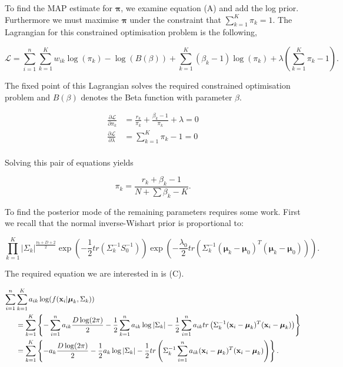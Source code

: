 \documentclass[12pt,english]{article}\usepackage[]{graphicx}\usepackage[]{color}
\begin{document}
To find the MAP estimate for $\boldsymbol{\pi}$, we examine equation
(A) and add the log prior.  Furthermore we must maximise
$\boldsymbol{\pi}$ under the constraint that
$\sum_{k=1}^{K}\pi_k = 1$. The Lagrangian for this constrained
optimisation problem is the following,

\begin{equation}
\mathcal{L}= \sum_{i=1}^{n}\sum_{k=1}^{K}w_{ik}\log(\pi_k) - \log(B(\beta)) + \sum_{k=1}^{K}(\beta_k - 1)\log(\pi_k) + \lambda\left(\sum_{k=1}^{K}\pi_k-1\right).
\end{equation}

The fixed point of this Lagrangian solves the required constrained
optimisation problem and $B(\beta)$ denotes the Beta function with
parameter $\beta$.

\begin{equation}
\begin{split}
\frac{\partial\mathcal{L}}{\partial \pi_k} &= \frac{r_k}{\pi_k} + \frac{\beta_k - 1}{\pi_k} + \lambda = 0\\
\frac{\partial\mathcal{L}}{\partial \lambda} &= \sum_{k=1}^{K}\pi_k - 1 = 0\\
\end{split}
\end{equation}

Solving this pair of equations yields

\begin{equation}
\pi_k = \frac{r_k + \beta_k - 1}{N + \sum \beta_k - K}.
\end{equation}

To find the posterior mode of the remaining parameters requires some
work.  First we recall that the normal inverse-Wishart prior is
proportional to:

\begin{equation}
\prod_{k=1}^{K}|\Sigma_{k}|^{\frac{\nu_0 + D + 2}{2}}\exp \left(-\frac{1}{2}tr(\Sigma_{k}^{-1}S_0^{-1})\right)\exp \left(-\frac{\lambda_0}{2}tr(\Sigma_{k}^{-1}(\boldsymbol{\mu}_k - \boldsymbol{\mu}_0)^{T}(\boldsymbol{\mu}_k - \boldsymbol{\mu}_0))\right).
\end{equation}

The required equation we are interested in is (C).

\begin{equation}
\begin{split}
\sum_{i=1}^{n} &\sum_{k=1}^{K}a_{ik}\log (f({\bf x}_i|\boldsymbol{\mu}_k, \Sigma_k))\\
& = \sum_{k=1}^{K}\left\{- \sum_{i=1}^{n} a_{ik}\frac{D\log(2\pi)}{2} - \frac{1}{2}\sum_{k=1}^{n}a_{ik}\log|\Sigma_{k}| - \frac{1}{2}\sum_{i=1}^{n}a_{ik}tr\left(\Sigma_{k}^{-1}({\bf x}_i - \boldsymbol{\mu}_k)^{T}({\bf x}_i - \boldsymbol{\mu}_k)\right)\right\}\\
& = \sum_{k=1}^{K}\left\{- a_k\frac{D\log(2\pi)}{2} - \frac{1}{2}a_k\log|\Sigma_{k}| - \frac{1}{2}tr\left(\Sigma_{k}^{-1}\sum_{i=1}^{n}a_{ik}({\bf x}_i - \boldsymbol{\mu}_k)^{T}({\bf x}_i - \boldsymbol{\mu}_k)\right)\right\}.
\end{split}
\end{equation}
\end{document}
